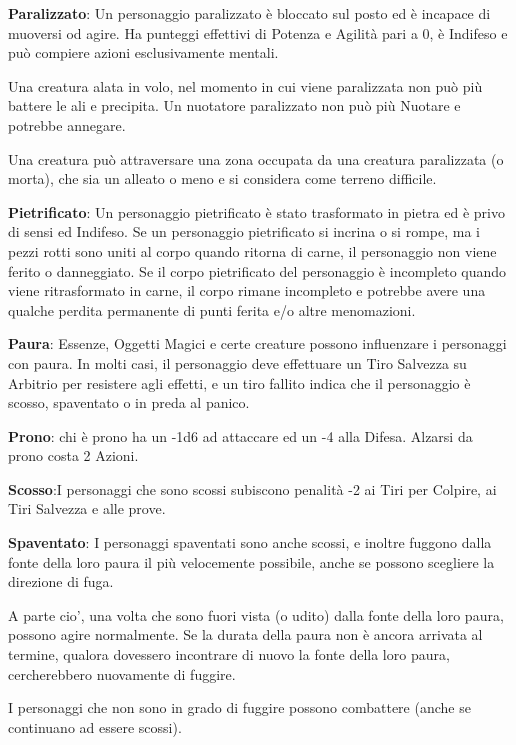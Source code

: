 \documentclass[a4paper,11pt,twoside,openany]{book}
\begin{document}
\textbf{Paralizzato}: Un personaggio paralizzato è bloccato sul posto ed è incapace di muoversi od agire. Ha punteggi effettivi di Potenza e Agilità pari a 0, è Indifeso e può compiere azioni esclusivamente mentali.

Una creatura alata in volo, nel momento in cui viene paralizzata non può più battere le ali e precipita.
Un nuotatore paralizzato non può più Nuotare e potrebbe annegare.

Una creatura può attraversare una zona occupata da una creatura paralizzata (o morta), che sia un alleato o meno e si considera come terreno difficile.

\textbf{Pietrificato}: Un personaggio pietrificato è stato trasformato in pietra ed è privo di sensi ed Indifeso. Se un personaggio pietrificato si incrina o si rompe, ma i pezzi rotti sono uniti al corpo quando ritorna di carne, il personaggio non viene ferito o danneggiato. Se il corpo pietrificato del personaggio è incompleto quando viene ritrasformato in carne, il corpo rimane incompleto e potrebbe avere una qualche perdita permanente di punti ferita e/o altre menomazioni.

\textbf{Paura}: Essenze, Oggetti Magici e certe creature possono influenzare i personaggi con paura. In molti casi, il personaggio deve effettuare un Tiro Salvezza su Arbitrio per resistere agli effetti, e un tiro fallito indica che il personaggio è scosso, spaventato o in preda al panico.

\textbf{Prono}: chi è prono ha un -1d6 ad attaccare ed un -4 alla Difesa. Alzarsi da prono costa 2 Azioni.

\textbf{Scosso}:I personaggi che sono scossi subiscono penalità -2 ai Tiri per Colpire, ai Tiri Salvezza e alle prove.

\textbf{Spaventato}: I personaggi spaventati sono anche scossi, e inoltre fuggono dalla fonte della loro paura il più velocemente possibile, anche se possono scegliere la direzione di fuga.

A parte cio', una volta che sono fuori vista (o udito) dalla fonte della loro paura, possono agire normalmente. Se la durata della paura non è ancora arrivata al termine, qualora dovessero incontrare di nuovo la fonte della loro paura, cercherebbero nuovamente di fuggire.

I personaggi che non sono in grado di fuggire possono combattere (anche se continuano ad essere scossi).
\end{document}
